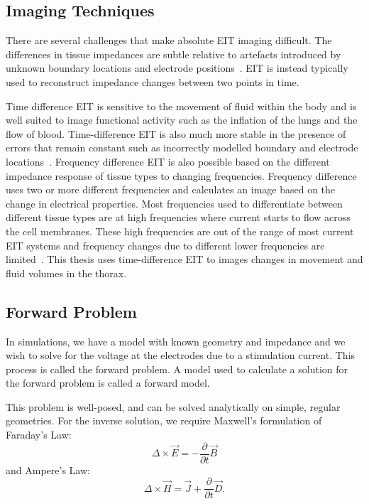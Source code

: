 \subsection{Imaging Techniques}
There are several challenges that make absolute EIT imaging difficult. 
The differences in tissue impedances are subtle relative to artefacts introduced 
by unknown boundary locations and electrode 
positions~\parencite{adler_why_2015,adler_electrical_2017,nissinen_compensation_2009}. 
EIT is instead typically used to reconstruct impedance changes between two points in time.

Time difference EIT is sensitive to the movement of fluid within the body 
and is well suited to image functional activity such as 
the inflation of the lungs 
and the flow of blood.
Time-difference EIT is also much more stable in the presence of errors that remain 
constant such as incorrectly modelled boundary and electrode 
locations~\parencite{brown_electrical_2003,adler_electrical_2017}.
Frequency difference EIT is also possible based on the different impedance response 
of tissue types to changing frequencies. Frequency difference uses 
two or more different frequencies and calculates an image based on the change in electrical properties.
Most frequencies used to differentiate between different tissue types are at high frequencies 
where current starts to flow across the cell membranes. 
These high frequencies are out of the range of most current EIT systems and 
frequency changes due to different lower frequencies are limited~\parencite{adler_electrical_2017}.
This thesis uses time-difference EIT to images changes in movement and fluid volumes in the thorax.

\subsection{Forward Problem} \label{sec:fwd}
In simulations, we have a model with known geometry and impedance and we wish to solve for the 
voltage at the electrodes due to a stimulation current. 
This process is called the forward problem. 
A model used to calculate a solution for the forward problem is called a forward 
model. 

This problem is well-posed, and can be solved analytically on simple, regular geometries. 
For the inverse solution, we require Maxwell's formulation of Faraday's Law:
\begin{equation} \label{eq:farad}
\Delta \times \vec{E} = -\frac{\partial}{\partial t} \vec{B}
\end{equation}
and Ampere's Law: 
\begin{equation} \label{eq:amp}
\Delta \times \vec{H} = \vec{J} + \frac{\partial}{\partial t} \vec{D}.
\end{equation}

